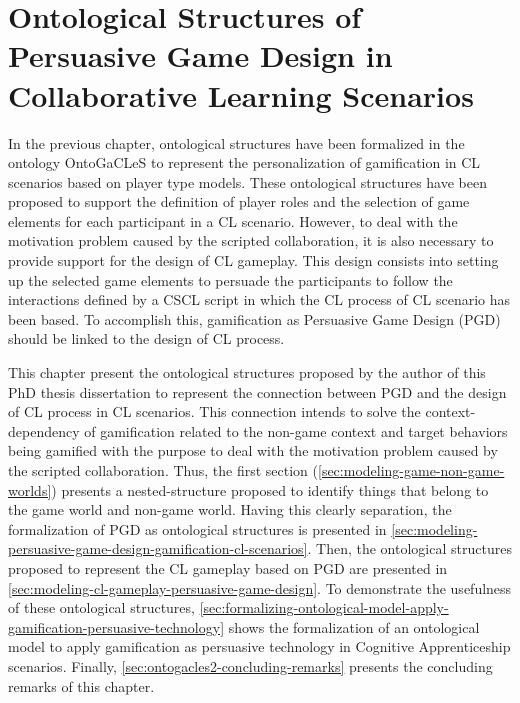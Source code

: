 \chapter[Ontological Structures of Persuasive Game Design in CL Scenarios]{Ontological Structures of Persuasive Game Design in Collaborative Learning Scenarios}
\label{chapter:ontogacles-2}

In the previous chapter, ontological structures have been formalized in the ontology OntoGaCLeS to represent the personalization of gamification in CL scenarios based on player type models. These ontological structures have been proposed to support the definition of player roles and the selection of game elements for each participant in a CL scenario. However, to deal with the motivation problem caused by the scripted collaboration, it is also necessary to provide support for the design of CL gameplay. This design consists into setting up the selected game elements to persuade the participants to follow the interactions defined by a CSCL script in which the CL process of CL scenario has been based. To accomplish this, gamification as Persuasive Game Design (PGD) should be linked to the design of CL process.

This chapter present the ontological structures proposed by the author of this PhD thesis dissertation to represent the connection between PGD and the design of CL process in CL scenarios. This connection intends to solve the context-dependency of gamification related to the non-game context and target behaviors being gamified with the purpose to deal with the motivation problem caused by the scripted collaboration. Thus, the first section (\autoref{sec:modeling-game-non-game-worlds}) presents a nested-structure proposed to identify things that belong to the game world and non-game world. Having this clearly separation, the formalization of PGD as ontological structures is presented in \autoref{sec:modeling-persuasive-game-design-gamification-cl-scenarios}. Then, the ontological structures proposed to represent the CL gameplay based on PGD are presented in \autoref{sec:modeling-cl-gameplay-persuasive-game-design}. To demonstrate the usefulness of these ontological structures, \autoref{sec:formalizing-ontological-model-apply-gamification-persuasive-technology} shows the formalization of an ontological model to apply gamification as persuasive technology in Cognitive Apprenticeship scenarios. Finally, \autoref{sec:ontogacles2-concluding-remarks} presents the concluding remarks of this chapter.
 
